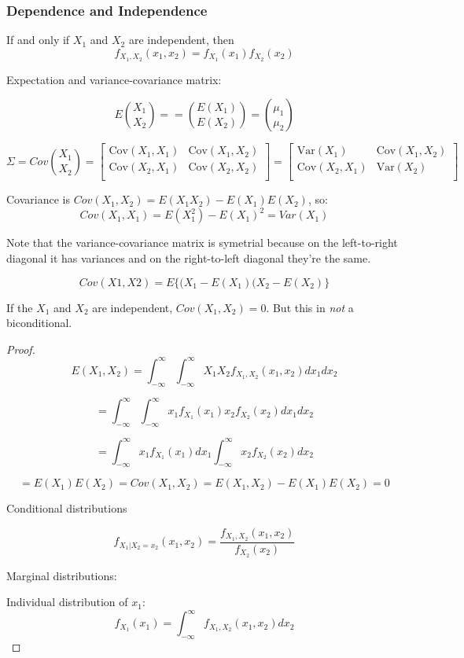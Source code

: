 \documentclass{report}
\begin{document}
\subsubsection{Dependence and Independence}

If and only if $X_1$ and $X_2$ are independent, then $$f_{X_1, X_2}(x_1, x_2) = f_{X_1}(x_1)f_{X_2}(x_2)$$

Expectation and variance-covariance matrix:

$$E  {X_1 \choose X_2}  == {E(X_1) \choose E(X_2)} = {\mu_1 \choose \mu_2}$$

$$ \Sigma = Cov{X_1 \choose X_2} = \begin{bmatrix}
\text{Cov}(X_1, X_1) & \text{Cov}(X_1, X_2) \\
\text{Cov}(X_2, X_1) & \text{Cov}(X_2, X_2) \\
\end{bmatrix} = 
\begin{bmatrix}
\text{Var}(X_1) & \text{Cov}(X_1, X_2) \\
\text{Cov}(X_2, X_1) & \text{Var}(X_2) \\
\end{bmatrix}  $$ 


Covariance is $Cov(X_1, X_2) = E(X_1 X_2) - E(X_1) E(X_2)$, so: $$Cov(X_1, X_1) = E(X_1^2) - E(X_1)^2 = Var(X_1)$$

Note that the variance-covariance matrix is symetrial because on the left-to-right diagonal it has variances and on the right-to-left diagonal they're the same.

$$Cov(X1, X2) = E \{(X_1 - E(X_1)(X_2 - E(X_2) \}$$

If the $X_1$ and $X_2$ are independent, $Cov(X_1, X_2) = 0$. But this in \textit{not} a biconditional.

\begin{proof}
$$E(X_1, X_2) = \int_{-\infty}^{\infty}\int_{-\infty}^{\infty} X_1 X_2 f_{X_1, X_2}(x_1, x_2) dx_1 dx_2 $$

$$ = \int_{-\infty}^{\infty}\int_{-\infty}^{\infty} x_1 f_{X_1} (x_1) x_2 f_{X_2} (x_2) dx_1 dx_2$$

$$ = \int_{-\infty}^{\infty} x_1 f_{X_1} (x_1) dx_1\int_{-\infty}^{\infty}  x_2 f_{X_2} (x_2)  dx_2$$

$$=E(X_1) E(X_2) = Cov(X_1, X_2) = E(X_1, X_2) - E(X_1)E(X_2) = 0$$

Conditional distributions

$$f_{X_1 | X_2 = x_2} (x_1, x_2) = \frac{f_{X_1, X_2}(x_1, x_2)}{f_{X_2}(x_2)}$$

Marginal distributions:

Individual distribution of $x_1$: $$f_{X_1} (x_1) = \int_{-\infty}^{\infty} f_{X_1, X_2} (x_1, x_2) dx_2$$

\end{proof}
\end{document}
